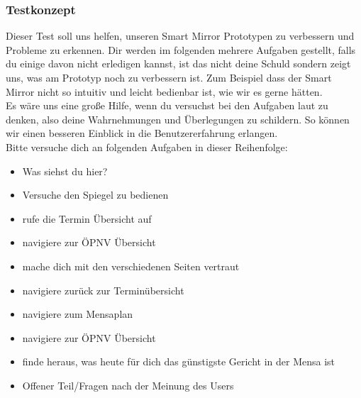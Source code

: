 \documentclass[12pt, a4paper]{scrartcl}
\begin{document}
	\subsubsection*{Testkonzept}
	Dieser Test soll uns helfen, unseren Smart Mirror Prototypen zu verbessern und Probleme zu erkennen. Dir werden im folgenden mehrere Aufgaben 			gestellt, falls du einige davon nicht erledigen kannst, ist das nicht deine Schuld sondern zeigt uns, was am Prototyp noch zu verbessern ist. Zum 	Beispiel dass der Smart Mirror nicht so intuitiv und leicht bedienbar ist, wie wir es gerne hätten.\\
	Es wäre uns eine große Hilfe, wenn du versuchst bei den Aufgaben laut zu denken, also deine Wahrnehmungen und Überlegungen zu schildern. So 			können wir einen besseren Einblick in die Benutzererfahrung erlangen.\\
	Bitte versuche dich an folgenden Aufgaben in dieser Reihenfolge:\\
	\begin{itemize}
		\setlength{\itemsep}{-0.5em}
		\item Was siehst du hier?
		\item Versuche den Spiegel zu bedienen
		\item rufe die Termin Übersicht auf
		\item navigiere zur ÖPNV  Übersicht
		\item mache dich mit den verschiedenen Seiten vertraut
		\item navigiere zurück zur Terminübersicht
		\item navigiere zum Mensaplan
		\item navigiere zur ÖPNV  Übersicht
		\item finde heraus, was heute für dich das günstigste Gericht in der Mensa ist
		\item Offener Teil/Fragen nach der Meinung des Users
	\end{itemize}
	
\end{document}
